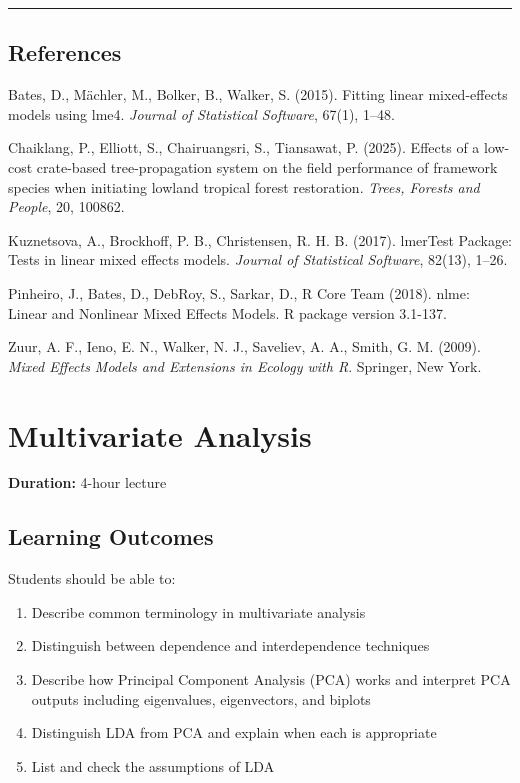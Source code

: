 \documentclass[
]{book}
\providecommand{\tightlist}{%
  \setlength{\itemsep}{0pt}\setlength{\parskip}{0pt}}
\begin{document}
\begin{center}\rule{0.5\linewidth}{0.5pt}\end{center}

\section{References}\label{references-10}

Bates, D., Mächler, M., Bolker, B., Walker, S. (2015). Fitting linear mixed-effects models using lme4. \emph{Journal of Statistical Software}, 67(1), 1--48.

Chaiklang, P., Elliott, S., Chairuangsri, S., Tiansawat, P. (2025). Effects of a low-cost crate-based tree-propagation system on the field performance of framework species when initiating lowland tropical forest restoration. \emph{Trees, Forests and People}, 20, 100862.

Kuznetsova, A., Brockhoff, P. B., Christensen, R. H. B. (2017). lmerTest Package: Tests in linear mixed effects models. \emph{Journal of Statistical Software}, 82(13), 1--26.

Pinheiro, J., Bates, D., DebRoy, S., Sarkar, D., R Core Team (2018). nlme: Linear and Nonlinear Mixed Effects Models. R package version 3.1-137.

Zuur, A. F., Ieno, E. N., Walker, N. J., Saveliev, A. A., Smith, G. M. (2009). \emph{Mixed Effects Models and Extensions in Ecology with R}. Springer, New York.

\chapter{Multivariate Analysis}\label{multivariate-analysis}

\textbf{Duration:} 4-hour lecture

\section{Learning Outcomes}\label{learning-outcomes-12}

Students should be able to:

\begin{enumerate}
\def\labelenumi{\arabic{enumi}.}
\tightlist
\item
  Describe common terminology in multivariate analysis
\item
  Distinguish between dependence and interdependence techniques
\item
  Describe how Principal Component Analysis (PCA) works and interpret PCA outputs including eigenvalues, eigenvectors, and biplots
\item
  Distinguish LDA from PCA and explain when each is appropriate
\item
  List and check the assumptions of LDA
\end{enumerate}
\end{document}
